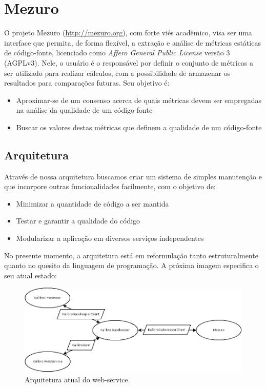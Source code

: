 \documentclass[12pt]{article}
\begin{document}
\section{Mezuro}
O projeto Mezuro (\url{http://mezuro.org}), com forte viés acadêmico, visa ser uma interface que permita, de forma flexível, a extração e análise de métricas estáticas de código-fonte, licenciado como \textit{Affero General Public License} versão 3 (AGPLv3). Nele, o usuário é o responsável por definir o conjunto de métricas a ser utilizado para realizar cálculos, com a possibilidade de armazenar os resultados para comparações futuras. Seu objetivo é:

\begin{itemize}
    \item Aproximar-se de um consenso acerca de quais métricas devem ser empregadas na análise da qualidade de um código-fonte
    \item Buscar os valores destas métricas que definem a qualidade de um código-fonte
\end{itemize}

  \subsection{Arquitetura}
  Através de nossa arquitetura buscamos criar um sistema de simples manutenção e que incorpore outras funcionalidades facilmente, com o objetivo de:
  \begin{itemize}
    \item Minimizar a quantidade de código a ser mantida
    \item Testar e garantir a qualidade do código
    \item Modularizar a aplicação em diversos serviços independentes
  \end{itemize}

  No presente momento, a arquitetura está em reformulação tanto estruturalmente quanto no quesito da linguagem de programação.
  A próxima imagem especifica o seu atual estado:

  \begin{figure}[h!]
    \centering
      \includegraphics[scale=0.5]{images/mezuro-architecture-actual.png}
    \caption{Arquitetura atual do web-service.}
    \label{fig:architecture-1}
  \end{figure}
\end{document}
